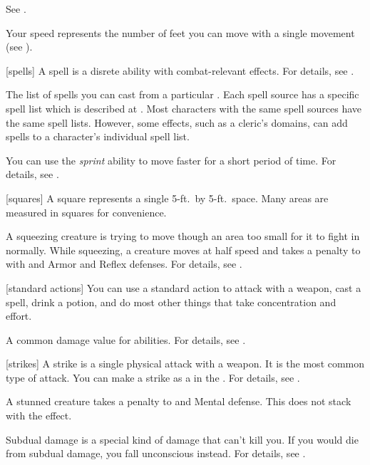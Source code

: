  See .

 Your speed represents the number of feet you can move with a single movement (see ).

[spells] A spell is a disrete  ability with combat-relevant effects.
For details, see .

 The list of spells you can cast from a particular .
Each spell source has a specific spell list which is described at .
Most characters with the same spell sources have the same spell lists.
However, some effects, such as a cleric's domains, can add spells to a character's individual spell list.

 You can use the \textit{sprint} ability to move faster for a short period of time.
For details, see .

[squares] A square represents a single 5-ft.\ by 5-ft.\ space.
Many areas are measured in squares for convenience.

 A squeezing creature is trying to move though an area too small for it to fight in normally.
While squeezing, a creature moves at half speed and takes a  penalty to  with  and Armor and Reflex defenses.
For details, see .

[standard actions] You can use a standard action to attack with a weapon, cast a spell, drink a potion, and do most other things that take concentration and effort.

 A common damage value for abilities.
For details, see .

[strikes] A strike is a single physical attack with a weapon.
It is the most common type of attack.
You can make a strike as a  in the .
For details, see .

 A stunned creature takes a  penalty to  and Mental defense.
This does not stack with the  effect.

 Subdual damage is a special kind of damage that can't kill you.
If you would die from subdual damage, you fall unconscious instead.
For details, see .

